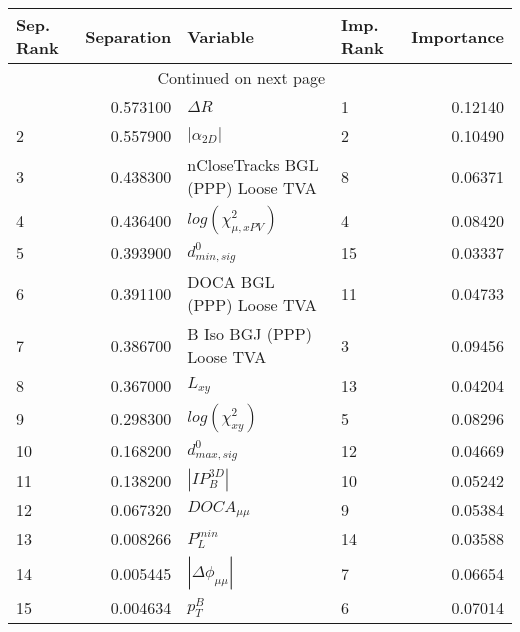 \usepackage{lscape}

\begin{landscape}
\begin{longtable}{lrllr}
\toprule
Sep. Rank &  Separation &                          Variable & Imp. Rank &  Importance \\
\midrule
\endhead
\midrule
\multicolumn{3}{r}{{Continued on next page}} \\
\midrule
\endfoot

\bottomrule
\endlastfoot
        1 &    0.573100 &                        $\Delta R$ &         1 &     0.12140 \\
        2 &    0.557900 &                   $|\alpha_{2D}|$ &         2 &     0.10490 \\
        3 &    0.438300 &  nCloseTracks BGL (PPP) Loose TVA &         8 &     0.06371 \\
        4 &    0.436400 &         $log(\chi^{2}_{\mu,xPV})$ &         4 &     0.08420 \\
        5 &    0.393900 &                  $d^0_{min, sig}$ &        15 &     0.03337 \\
        6 &    0.391100 &          DOCA BGL (PPP) Loose TVA &        11 &     0.04733 \\
        7 &    0.386700 &         B Iso BGJ (PPP) Loose TVA &         3 &     0.09456 \\
        8 &    0.367000 &                          $L_{xy}$ &        13 &     0.04204 \\
        9 &    0.298300 &              $log(\chi^{2}_{xy})$ &         5 &     0.08296 \\
       10 &    0.168200 &                  $d^0_{max, sig}$ &        12 &     0.04669 \\
       11 &    0.138200 &                   $|IP_{B}^{3D}|$ &        10 &     0.05242 \\
       12 &    0.067320 &                   $DOCA_{\mu\mu}$ &         9 &     0.05384 \\
       13 &    0.008266 &                     $P^{min}_{L}$ &        14 &     0.03588 \\
       14 &    0.005445 &          $|\Delta \phi_{\mu\mu}|$ &         7 &     0.06654 \\
       15 &    0.004634 &                         $p^B_{T}$ &         6 &     0.07014 \\
\end{longtable}

\end{landscape}
